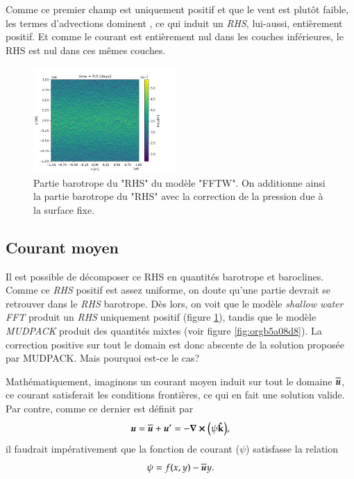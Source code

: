 \documentclass[10pt]{article}
\numberwithin{equation}{section}
\newcommand{\kvf}{\vb{\hat{k}}}
\newcommand{\uu}{\vb*{u}}
\begin{document}
Comme ce premier champ est uniquement positif et que le vent est plutôt faible, les termes d'advections dominent , ce qui induit un \emph{RHS}, lui-aussi, entièrement positif.
Et comme le courant est entièrement nul dans les couches inférieures, le RHS est nul dans ces mêmes couches. \bigskip

\begin{figure} \vspace{-\baselineskip} \centering
\centering
\includegraphics[width=0.48\textwidth]{figures/debuggage/2023_06_12_RHSuBTfftw.png}
\caption{\label{fig:org8bc32d7}Partie barotrope du "RHS" du modèle "FFTW". On additionne ainsi la partie barotrope du "RHS" avec la correction de la pression due à la surface fixe.}
\end{figure}

\subsection{Courant moyen}
\label{sec:org4118352}

Il est possible de décomposer ce RHS en quantités barotrope et baroclines.
Comme ce \emph{RHS} positif est assez uniforme, on doute qu'une partie devrait se retrouver dans le \emph{RHS} barotrope.
Dès lors, on voit que le modèle \emph{shallow water FFT} produit un \emph{RHS} uniquement positif (figure \ref{fig:org8bc32d7}), tandis que le modèle \emph{MUDPACK} produit des quantités mixtes (voir figure \ref{fig:orgb5a08d8}).
La correction positive sur tout le domain est donc abscente de la solution proposée par MUDPACK.
Mais pourquoi est-ce le cas?\bigskip

Mathématiquement, imaginons un courant moyen induit sur tout le domaine \(\overline{\uu}\), ce courant satisferait les conditions frontières, ce qui en fait une solution valide.
Par contre, comme ce dernier est définit par
\begin{equation}
   \uu = \overline{\uu} + \uu' = - \curl(\psi\kvf),
\end{equation}
il faudrait impérativement que la fonction de courant (\(\psi\)) satisfasse la relation
\begin{equation}
\label{eq:org89c115c}
   \psi = f(x,y) - \overline{\uu} y.
\end{equation}
\end{document}
